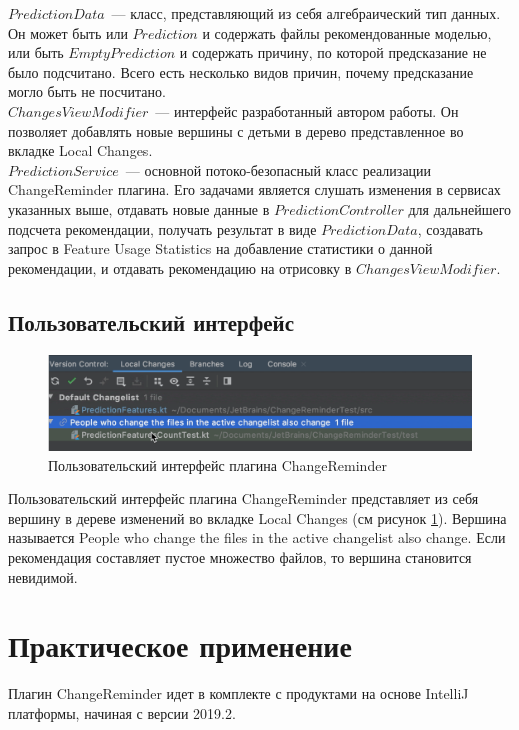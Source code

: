 $PredictionData$~--- класс, представляющий из себя алгебраический тип данных. Он может быть или $Prediction$ и содержать файлы рекомендованные моделью, или быть $EmptyPrediction$ и содержать причину, по которой предсказание не было подсчитано.
Всего есть несколько видов причин, почему предсказание могло быть не посчитано.\\


$ChangesViewModifier$~--- интерфейс разработанный автором работы. Он позволяет добавлять новые вершины с детьми в дерево представленное во вкладке Local Changes.\\


$PredictionService$~--- основной потоко-безопасный класс реализации ChangeReminder плагина. Его задачами является слушать изменения в сервисах указанных выше, отдавать новые данные в $PredictionController$ для дальнейшего подсчета рекомендации, получать результат в виде $PredictionData$, создавать запрос в Feature Usage Statistics на добавление статистики о данной рекомендации, и отдавать рекомендацию на отрисовку в $ChangesViewModifier$.
\subsection{Пользовательский интерфейс}
\begin{figure}[!h]
\caption{Пользовательский интерфейс плагина ChangeReminder}\label{ChangeReminder-ui}
\centering
\includegraphics[scale=0.4]{images/ChangeReminderUI.png}
\end{figure}
Пользовательский интерфейс плагина ChangeReminder представляет из себя вершину в дереве изменений во вкладке Local Changes (см рисунок \ref{ChangeReminder-ui}). Вершина называется People who change the files in the active changelist also change. Если рекомендация составляет пустое множество файлов, то вершина становится невидимой.
\section{Практическое применение}
Плагин ChangeReminder идет в комплекте с продуктами на основе IntelliJ платформы, начиная с версии 2019.2.

